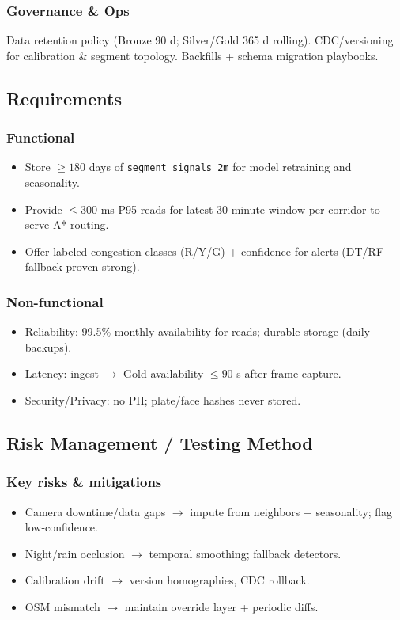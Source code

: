 \subsubsection{Governance \& Ops}
Data retention policy (Bronze 90 d; Silver/Gold 365 d rolling). CDC/versioning for calibration \& segment topology. Backfills + schema migration playbooks.

\subsection{Requirements}
\subsubsection{Functional}
\begin{itemize}
  \item Store $\ge 180$ days of \texttt{segment\_signals\_2m} for model retraining and seasonality.
  \item Provide $\le 300$ ms P95 reads for latest 30-minute window per corridor to serve A* routing.
  \item Offer labeled congestion classes (R/Y/G) + confidence for alerts (DT/RF fallback proven strong).
\end{itemize}

\subsubsection{Non-functional}
\begin{itemize}
  \item Reliability: 99.5\% monthly availability for reads; durable storage (daily backups).
  \item Latency: ingest $\rightarrow$ Gold availability $\le 90$ s after frame capture.
  \item Security/Privacy: no PII; plate/face hashes never stored.
\end{itemize}

\subsection{Risk Management / Testing Method}
\subsubsection{Key risks \& mitigations}
\begin{itemize}
  \item Camera downtime/data gaps $\rightarrow$ impute from neighbors + seasonality; flag low-confidence.
  \item Night/rain occlusion $\rightarrow$ temporal smoothing; fallback detectors.
  \item Calibration drift $\rightarrow$ version homographies, CDC rollback.
  \item OSM mismatch $\rightarrow$ maintain override layer + periodic diffs.
\end{itemize}

